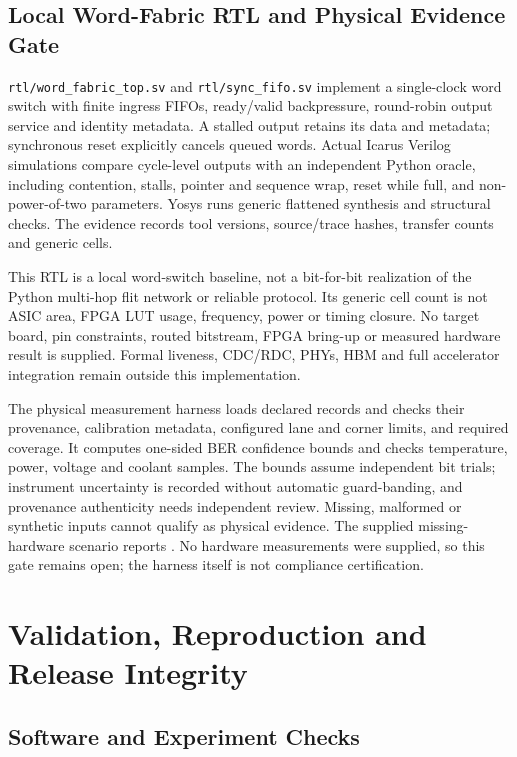 \documentclass[11pt,a4paper]{article}
\begin{document}
\subsection{Local Word-Fabric RTL and Physical Evidence Gate}

\texttt{rtl/word\_fabric\_top.sv} and \texttt{rtl/sync\_fifo.sv} implement
a single-clock word switch with finite ingress FIFOs, ready/valid
backpressure, round-robin output service and identity metadata. A stalled
output retains its data and metadata; synchronous reset explicitly cancels
queued words. Actual Icarus Verilog simulations compare cycle-level outputs
with an independent Python oracle, including contention, stalls, pointer and
sequence wrap, reset while full, and non-power-of-two parameters. Yosys runs
generic flattened synthesis and structural checks. The evidence records tool
versions, source/trace hashes, transfer counts and generic cells.

This RTL is a local word-switch baseline, not a bit-for-bit realization of the
Python multi-hop flit network or reliable protocol. Its generic cell count is
not ASIC area, FPGA LUT usage, frequency, power or timing closure. No target
board, pin constraints, routed bitstream, FPGA bring-up or measured hardware
result is supplied. Formal liveness, CDC/RDC, PHYs, HBM and full accelerator
integration remain outside this implementation.

The physical measurement harness loads declared records and checks their
provenance, calibration metadata, configured lane and corner limits, and
required coverage. It computes one-sided BER confidence bounds and checks
temperature, power, voltage and coolant samples.
The bounds assume independent bit trials; instrument uncertainty is recorded
without automatic guard-banding, and provenance authenticity needs independent
review. Missing, malformed or synthetic inputs cannot qualify as physical
evidence. The supplied missing-hardware scenario reports
. No hardware measurements were supplied, so
this gate remains open; the harness itself is not compliance certification.

\section{Validation, Reproduction and Release Integrity}\label{sec:repro}

\subsection{Software and Experiment Checks}
\end{document}
